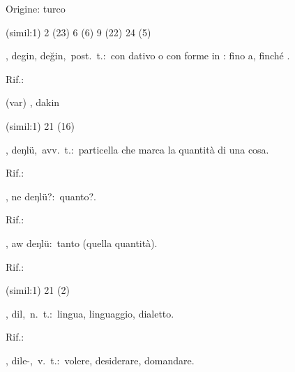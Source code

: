 \begin{glossario}{Origine: turco}
\begin{subvocedue}
\item[(simil:1)]   2 (23) 6 (6) 9 (22) 24 (5)
\end{subvocedue}
\item[{\color{colorlowref}\spzrl{dak.In}},] {\sf degin, değin},\ post.\ t.:\ con dativo o con forme in : fino a, finché \verificare.
\begin{subvocedue}
\item[Rif.:] 
\end{subvocedue}
\begin{subvocedue}
\item[(var)] , {\sf dakin}\item[(simil:1)]   21 (16)
\end{subvocedue}
\item[{\color{colorlowref}\spzrl{de^nl:U}},] {\sf deŋlü},\ avv.\ t.:\ particella che marca la quantità di una cosa.
\begin{subvocedue}
\item[Rif.:] 
\end{subvocedue}
\begin{subvocedue}
\item[\subglossariobullet] , {\sf ne deŋlü?}:\ quanto?.
\begin{subvocedue}
\item[Rif.:] 
\end{subvocedue}
\item[\subglossariobullet] , {\sf aw deŋlü}:\ tanto (quella quantità).
\begin{subvocedue}
\item[Rif.:] 
\end{subvocedue}
\item[(simil:1)]   21 (2)
\end{subvocedue}
\item[{\color{colorsologlossario}{\bf (g)}}] {\color{colorsologlossario}}, {\sf dil},\ n.\ t.:\ lingua, linguaggio, dialetto.
\begin{subvocedue}
\item[Rif.:] 
\end{subvocedue}
\item[{\color{colorsologlossario}{\bf (g)}}] {\color{colorsologlossario}}, {\sf dile-},\ v.\ t.:\ volere, desiderare, domandare.

\end{glossario}
